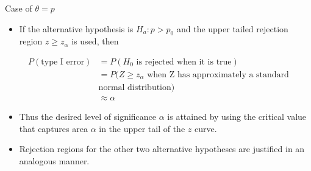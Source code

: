 \documentclass[
  ignorenonframetext,
]{beamer}
\providecommand{\tightlist}{%
  \setlength{\itemsep}{0pt}\setlength{\parskip}{0pt}}\usepackage{longtable,booktabs,array}
\begin{document}
\begin{frame}{Case of \(\theta = p\)}
\protect\hypertarget{case-of-theta-p-2}{}
\begin{itemize}[<+->]
\tightlist
\item
  If the alternative hypothesis is \(H_{a}: p > p_{0}\) and the upper
  tailed rejection region \(z \geq z_{\alpha}\) is used, then
\end{itemize}

\[
\begin{aligned}
P(\text{type I error}) &= P(H_{0} \text{ is rejected when it is true}) \\
&= P(Z \geq z_{\alpha} \text{ when Z has approximately a standard} \\
&\text{normal distribution}) \\
&\approx \alpha
\end{aligned}
\]

\begin{itemize}[<+->]
\tightlist
\item
  Thus the desired level of significance \(\alpha\) is attained by using
  the critical value that captures area \(\alpha\) in the upper tail of
  the \(z\) curve.
\item
  Rejection regions for the other two alternative hypotheses are
  justified in an analogous manner.
\end{itemize}
\end{frame}
\end{document}
